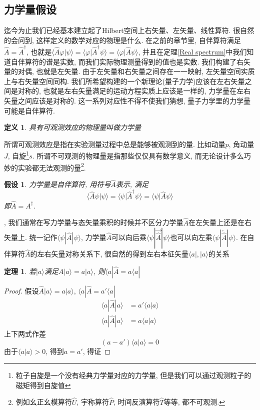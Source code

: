 \documentclass[a4paper,11pt]{book}
\newtheorem{definition}{\hspace{2em}定义}[section]
\newtheorem{theorem}{\hspace{2em}定理}[section]
\newtheorem{proof}{证明}[section]
\newtheorem{hypothesis}{假设}[section]
\begin{document}
\subsection{力学量假设}
迄今为止我们已经基本建立起了Hilbert空间上右矢量、左矢量、线性算符. 很自然的会问到, 这样定义的数学对应的物理是什么. 在之前的章节里, 自伴算符满足$\hat{A}=\hat{A}^{\dag}$, 也就是$\langle\hat{A}\varphi|\psi\rangle=\langle\varphi|\hat{A}^{\dag}\psi\rangle=\langle\varphi|\hat{A}\psi\rangle$, 并且在定理\ref{Real spectrum}中我们知道自伴算符的谱是实数, 而我们实际物理测量得到的值也是实数. 我们构建了右矢量的对偶, 也就是左矢量. 由于左矢量和右矢量之间存在一一映射, 左矢量空间实质上与右矢量空间同构. 我们所希望构建的一个新理论(量子力学)应该在左右矢量之间是对称的, 也就是左右矢量满足的运动方程实质上应该是一样的, 力学量在左右矢量之间应该是对称的. 这一系列对应性不得不使我们猜想, 量子力学里的力学量可能是自伴算符.
\begin{definition}
  具有可观测效应的物理量叫做力学量
\end{definition}
所谓可观测效应是指在实验测量过程中总是能够被观测到的量. 比如动量$p$, 角动量$J$, 自旋\footnote{粒子自旋是一个没有经典力学量对应的力学量, 但是我们可以通过观测粒子的磁矩得到自旋值}$s$. 所谓不可观测的物理量是指那些仅仅具有数学意义, 而无论设计多么巧妙的实验都无法观测的量\footnote{例如幺正幺模算符$\hat{U}$, 宇称算符$\hat{P}$, 时间反演算符$\hat{T}$等等, 都不可观测.}.
\begin{hypothesis}
  力学量是自伴算符, 用符号$\hat{A}$表示, 满足
\begin{equation*}
  \langle\hat{A}\psi|\psi\rangle=\langle\psi|\hat{A}^{\dag}\psi\rangle=\langle\psi|\hat{A}\psi\rangle
\end{equation*}
即$\hat{A}=A^{\dag}$.
\end{hypothesis}
, 我们通常在写力学量与态矢量乘积的时候并不区分力学量$\hat{A}$在左矢量上还是在右矢量上. 统一记作$\langle\psi|\hat{A}|\psi\rangle$, 力学量$\hat{A}$可以向后乘$\langle\psi|\overrightarrow{\hat{A}}|\psi\rangle$也可以向左乘$\langle\psi|\overleftarrow{\hat{A}}|\psi\rangle$. 在自伴算符$\hat{A}$的左右矢量对称关系下, 很自然的得到左右本征矢量$\langle a|,|a\rangle$的关系
\begin{theorem}
  若$|a\rangle$满足$\hat{A}|a\rangle=a|a\rangle$, 则$\langle a|\hat{A}=a\langle a|$
\end{theorem}
\begin{proof}
  假设$\hat{A}|a\rangle=a|a\rangle$, $\langle a|\hat{A}=a'\langle a|$
  \begin{equation*}
    \begin{split}
       \langle a|\hat{A}|a\rangle & =a'\langle a|a\rangle \\
       \langle a|\hat{A}|a\rangle & =a\langle a|a\rangle
    \end{split}
  \end{equation*}
  上下两式作差
  \begin{equation*}
    (a-a')\langle a|a\rangle=0
  \end{equation*}
  由于$\langle a|a\rangle>0$, 得到$a=a'$, 得证
\end{proof}
\end{document}
